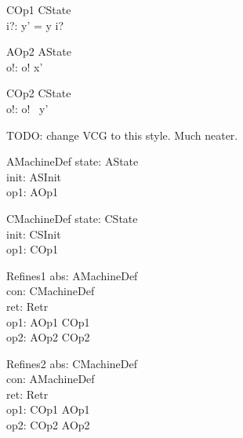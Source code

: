 \begin{schema}{COp1}
   \Delta CState \\
   i?: \nat
\where
   y' = y \cat \langle i? \rangle
\end{schema}

\begin{schema}{AOp2}
   \Xi AState \\
   o!: \nat
\where
    o! \in  x'
\end{schema}

\begin{schema}{COp2}
   \Xi CState \\
   o!: \nat
\where
   o! \in \ran~y'
\end{schema}

TODO: change VCG to this style. Much neater.

\begin{schema}{AMachineDef}
   state: AState \\
   init: ASInit \\
   op1: AOp1
\end{schema}

\begin{schema}{CMachineDef}
   state: CState \\
   init: CSInit \\
   op1: COp1
\end{schema}

\begin{schema}{Refines1}
   abs: AMachineDef \\
   con: CMachineDef \\
   ret: Retr \\
   op1: AOp1 \cross COp1 \\
   op2: AOp2 \cross COp2
\end{schema}

\begin{schema}{Refines2}
   abs: CMachineDef \\
   con: AMachineDef \\
   ret: Retr \\
   op1: COp1 \cross AOp1 \\
   op2: COp2 \cross AOp2
\end{schema}

